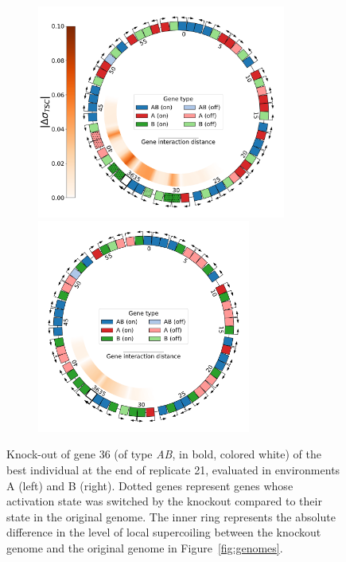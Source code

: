 \begin{figure}[H]
  \centering
  \begin{subfigure}[t]{\textwidth}
    \centering
    \includegraphics[height=7cm]{ploscb/img/ko_genome_and_tsc_env_A_gene_36.pdf}
    \hspace{-0.5cm}
    \includegraphics[height=7cm]{ploscb/img/ko_genome_and_tsc_env_B_gene_36.pdf}
  \end{subfigure}
  \caption{Knock-out of gene 36 (of type \emph{AB}, in bold, colored white) of the best individual at the end of replicate 21, evaluated in environments A (left) and B (right).
  Dotted genes represent genes whose activation state was switched by the knockout compared to their state in the original genome.
  The inner ring represents the absolute difference in the level of local supercoiling between the knockout genome and the original genome in Figure~\ref{fig:genomes}.}
  \label{fig:ko_genomes}
\end{figure}

